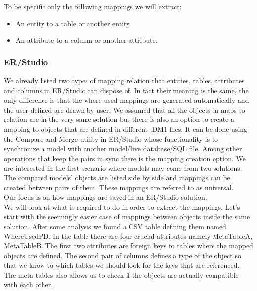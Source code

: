 To be specific only the following mappings we will extract: 
\begin{itemize}
	\item An entity to a table or another entity. 
	\item An attribute to a column or another attribute.
\end{itemize}

\subsubsection{ER/Studio}

We already listed two types of mapping relation that entities, tables, attributes and columns in ER/Studio can dispose of. 
In fact their meaning is the same, the only difference is that the where used mappings are generated automatically and the user-defined are drawn by user. We assumed that all the objects in maps-to relation are in the very same solution but there is also an option to create a mapping to objects that are defined in different .DM1 files. It can be done using the Compare and Merge utility in ER/Studio whose functionality is to synchronize a model with another model/live database/SQL file. Among other operations that keep the pairs in sync there is the mapping creation option. We are interested in the first scenario where models may come from two solutions. The compared models' objects are listed side by side and mappings can be created between pairs of them. These mappings are referred to as universal. \\

Our focus is on how mappings are saved in an ER/Studio solution. \\ 

We will look at what is required to do in order to extract the mappings.
Let's start with the seemingly easier case of mappings between objects inside the same solution. After some analysis we found a CSV table defining them named Where\textunderscore Used\textunderscore PD.
In the table there are four crucial attributes namely  Meta\textunderscore Table\textunderscore A, Meta\textunderscore Table\textunderscore B.
The first two attributes are foreign keys to tables where the mapped objects are defined. The second pair of columns defines a type of the object so that we know to which tables we should look for the keys that are referenced. The meta tables also allows us to check if the objects are actually compatible with each other. \\

